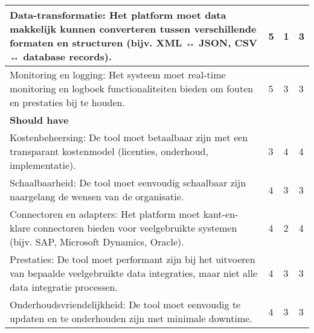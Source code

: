 \begin{landscape}
\begin{table}[H]
{\begin{tabular}{|llll|}
\multicolumn{1}{|l|}{Data-transformatie: Het platform moet data makkelijk kunnen converteren tussen verschillende formaten en structuren (bijv. XML ↔ JSON, CSV ↔ database records).}                                      & \multicolumn{1}{l|}{5}              & \multicolumn{1}{l|}{1}               & 3                     \\ \hline
\multicolumn{1}{|l|}{Monitoring en logging: Het systeem moet real-time monitoring en logboek functionaliteiten bieden om fouten en prestaties bij te houden.}                                                              & \multicolumn{1}{l|}{5}              & \multicolumn{1}{l|}{3}               & 3                     \\ \hline
\textbf{Should have}                                                                                                                                                                                                       &                                     &                                      &                       \\ \hline
\multicolumn{1}{|l|}{Kostenbeheersing: De tool moet betaalbaar zijn met een transparant kostenmodel (licenties, onderhoud, implementatie).}                                                                                & \multicolumn{1}{l|}{3}              & \multicolumn{1}{l|}{4}               & 4                     \\ \hline
\multicolumn{1}{|l|}{Schaalbaarheid: De tool moet eenvoudig schaalbaar zijn naargelang de wensen van de organisatie.}                                                                                                      & \multicolumn{1}{l|}{4}              & \multicolumn{1}{l|}{3}               & 3                     \\ \hline
\multicolumn{1}{|l|}{Connectoren en adapters: Het platform moet kant-en-klare connectoren bieden voor veelgebruikte systemen (bijv. SAP, Microsoft Dynamics, Oracle).}                                                     & \multicolumn{1}{l|}{4}              & \multicolumn{1}{l|}{2}               & 4                     \\ \hline
\multicolumn{1}{|l|}{Prestaties: De tool moet performant zijn bij het uitvoeren van bepaalde veelgebruikte data integraties, maar niet alle data integratie processen.}                                                    & \multicolumn{1}{l|}{4}              & \multicolumn{1}{l|}{3}               & 3                     \\ \hline
\multicolumn{1}{|l|}{Onderhoudsvriendelijkheid: De tool moet eenvoudig te updaten en te onderhouden zijn met minimale downtime.}                                                                                           & \multicolumn{1}{l|}{4}              & \multicolumn{1}{l|}{3}               & 3                     \\ \hline

\end{tabular}}
\end{table}
\end{landscape}
